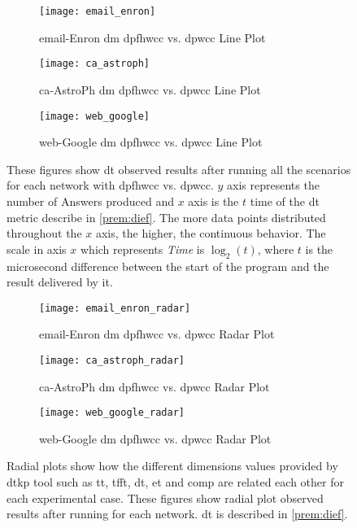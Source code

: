 \begin{figure}[!htp]
  \centering
  \begin{subfigure}[t]{0.3\textwidth}
   \texttt{[image: email\_enron]}
   \caption{email-Enron \acrlong{dm} \acrshort{dpfhwcc} vs. \acrshort{dpwcc} Line Plot}
    \label{fig:dief:new:1}
  \end{subfigure}\hfill
  \begin{subfigure}[t]{0.3\textwidth}
   \texttt{[image: ca\_astroph]}
   \caption{ca-AstroPh \acrlong{dm} \acrshort{dpfhwcc} vs. \acrshort{dpwcc} Line Plot}
    \label{fig:dief:new:2}
  \end{subfigure}\hfill
  \begin{subfigure}[t]{0.3\textwidth}
   \texttt{[image: web\_google]}
   \caption{web-Google \acrlong{dm} \acrshort{dpfhwcc} vs. \acrshort{dpwcc} Line Plot}
    \label{fig:dief:new:3}
  \end{subfigure}\hfill
   \caption{These figures show \acrshort{dt} observed results after running all the scenarios for each network with \acrshort{dpfhwcc} vs. \acrshort{dpwcc}. $y$ axis represents the number of Answers produced and $x$ axis is the $t$ time of the \acrshort{dt} metric describe in \autoref{prem:dief}. The more data points distributed throughout the $x$ axis, the higher, the continuous behavior. The scale in axis $x$ which represents \textit{Time} is $\log_{2}(t)$, where $t$ is the microsecond difference between the start of the program and the result delivered by it.}
   \label{fig:dief:all}
 \end{figure}


 \begin{figure}[!htp]
  \centering
  \begin{subfigure}[t]{0.3\textwidth}
   \texttt{[image: email\_enron\_radar]}
   \caption{email-Enron \acrlong{dm} \acrshort{dpfhwcc} vs. \acrshort{dpwcc} Radar Plot}
    \label{fig:dief:rad:new:1}
  \end{subfigure}\hfill
  \begin{subfigure}[t]{0.3\textwidth}
   \texttt{[image: ca\_astroph\_radar]}
   \caption{ca-AstroPh \acrlong{dm} \acrshort{dpfhwcc} vs. \acrshort{dpwcc} Radar Plot}
    \label{fig:dief:rad:new:2}
  \end{subfigure}\hfill
  \begin{subfigure}[t]{0.3\textwidth}
   \texttt{[image: web\_google\_radar]}
   \caption{web-Google \acrlong{dm} \acrshort{dpfhwcc} vs. \acrshort{dpwcc} Radar Plot}
    \label{fig:dief:rad:new:3}
  \end{subfigure}\hfill
   \caption{Radial plots show how the different dimensions values provided by \acrshort{dtkp} tool such as \acrshort{tt}, \acrshort{tfft}, \acrshort{dt}, \acrshort{et} and \acrshort{comp} are related each other for each experimental case. These figures show radial plot observed results after running for each network. \acrshort{dt} is described in \autoref{prem:dief}.}
   \label{fig:dief:radial:all}
 \end{figure}

